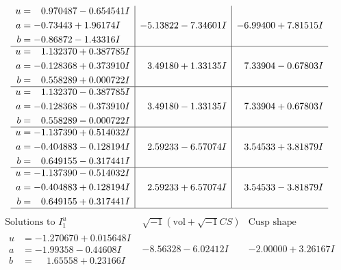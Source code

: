 \documentclass[1p]{elsarticle_modified}
\theoremstyle{definition}
\newcommand{\I}{\sqrt{-1}}
\begin{document}
$$\begin{array}{c|c|c}
\begin{aligned}
u &= \phantom{-}0.970487 - 0.654541 I \\
a &= -0.73443 + 1.96174 I \\
b &= -0.86872 - 1.43316 I\end{aligned}
 & -5.13822 - 7.34601 I & -6.99400 + 7.81515 I \\ \hline\begin{aligned}
u &= \phantom{-}1.132370 + 0.387785 I \\
a &= -0.128368 + 0.373910 I \\
b &= \phantom{-}0.558289 + 0.000722 I\end{aligned}
 & \phantom{-}3.49180 + 1.33135 I & \phantom{-}7.33904 - 0.67803 I \\ \hline\begin{aligned}
u &= \phantom{-}1.132370 - 0.387785 I \\
a &= -0.128368 - 0.373910 I \\
b &= \phantom{-}0.558289 - 0.000722 I\end{aligned}
 & \phantom{-}3.49180 - 1.33135 I & \phantom{-}7.33904 + 0.67803 I \\ \hline\begin{aligned}
u &= -1.137390 + 0.514032 I \\
a &= -0.404883 - 0.128194 I \\
b &= \phantom{-}0.649155 - 0.317441 I\end{aligned}
 & \phantom{-}2.59233 - 6.57074 I & \phantom{-}3.54533 + 3.81879 I \\ \hline\begin{aligned}
u &= -1.137390 - 0.514032 I \\
a &= -0.404883 + 0.128194 I \\
b &= \phantom{-}0.649155 + 0.317441 I\end{aligned}
 & \phantom{-}2.59233 + 6.57074 I & \phantom{-}3.54533 - 3.81879 I\\
 \hline 
 \end{array}$$\newpage$$\begin{array}{c|c|c}  
\text{Solutions to }I^u_{1}& \I (\text{vol} + \sqrt{-1}CS) & \text{Cusp shape}\\
 \hline 
\begin{aligned}
u &= -1.270670 + 0.015648 I \\
a &= -1.99358 - 0.44608 I \\
b &= \phantom{-}1.65558 + 0.23166 I\end{aligned}
 & -8.56328 - 6.02412 I & -2.00000 + 3.26167 I \\ \hline\begin{aligned}

\end{aligned}
\end{array}$$
\end{document}
